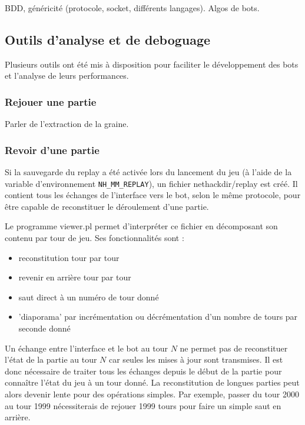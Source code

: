 \documentclass[a4paper,12pt]{article}
\begin{document}
BDD, généricité (protocole, socket, différents langages).
Algos de bots.

\subsection{Outils d'analyse et de deboguage}

Plusieurs outils ont été mis à disposition pour faciliter le développement des bots et l'analyse de leurs performances.

\subsubsection{Rejouer une partie}

Parler de l'extraction de la graine.

\subsubsection{Revoir d'une partie}

	Si la sauvegarde du replay a été activée lors du lancement du jeu (à l'aide de la variable d'environnement \verb!NH_MM_REPLAY!), un fichier nethackdir/replay est créé. Il contient tous les échanges de l'interface vers le bot, selon le même protocole, pour être capable de reconstituer le déroulement d'une partie.

Le programme viewer.pl permet d'interpréter ce fichier en décomposant son contenu par tour de jeu. Ses fonctionnalités sont :
\begin{itemize}
	\item reconstitution tour par tour
	\item revenir en arrière tour par tour
	\item saut direct à un numéro de tour donné
	\item 'diaporama' par incrémentation ou décrémentation d'un nombre de tours par seconde donné
\end{itemize}

Un échange entre l'interface et le bot au tour $N$ ne permet pas de reconstituer l'état de la partie au tour $N$ car seules les mises à jour sont transmises. Il est donc nécessaire de traiter tous les échanges depuis le début de la partie pour connaître l'état du jeu à un tour donné. La reconstitution de longues parties peut alors devenir lente pour des opérations simples. Par exemple, passer du tour 2000 au tour 1999 nécessiterais de rejouer 1999 tours pour faire un simple saut en arrière.
\end{document}
